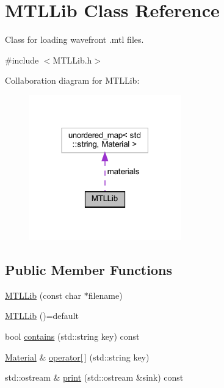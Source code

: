 \hypertarget{classMTLLib}{}\section{M\+T\+L\+Lib Class Reference}
\label{classMTLLib}


Class for loading wavefront .mtl files.  




{\ttfamily \#include $<$M\+T\+L\+Lib.\+h$>$}



Collaboration diagram for M\+T\+L\+Lib\+:
\nopagebreak
\begin{figure}[H]
\begin{center}
\leavevmode
\includegraphics[width=186pt]{classMTLLib__coll__graph}
\end{center}
\end{figure}
\subsection*{Public Member Functions}
\begin{DoxyCompactItemize}
\item 
\mbox{\hyperlink{classMTLLib_a9d67275ad7ced3768135bd40bc821616}{M\+T\+L\+Lib}} (const char $\ast$filename)
\item 
\mbox{\hyperlink{classMTLLib_a1f6320f63cdc48012b12b993ce74777c}{M\+T\+L\+Lib}} ()=default
\item 
bool \mbox{\hyperlink{classMTLLib_a11ea8731bc57aae94ad40af443821cb4}{contains}} (std\+::string key) const
\item 
\mbox{\hyperlink{classMaterial}{Material}} \& \mbox{\hyperlink{classMTLLib_a47584cec05a84d6b173c655515788b76}{operator\mbox{[}$\,$\mbox{]}}} (std\+::string key)
\item 
std\+::ostream \& \mbox{\hyperlink{classMTLLib_a058c3501417711e8e3e3f30f99a930b5}{print}} (std\+::ostream \&sink) const
\end{DoxyCompactItemize}

